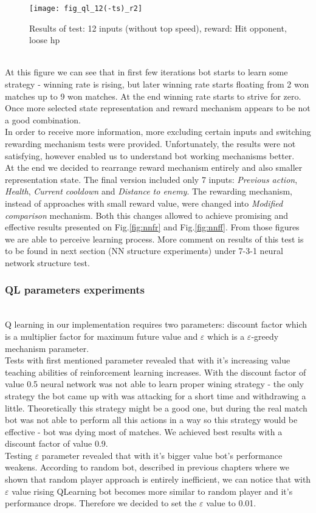 \begin{figure}[htp]
\centerline{\texttt{[image: fig\_ql\_12(-ts)\_r2]}}
\caption{Results of test: 12 inputs (without top speed), reward: Hit opponent, loose hp}
\label{fig:third}
\end{figure}
\\ \hphantom{x}
At this figure we can see that in first few iterations bot starts to learn some strategy - winning rate is rising, but later winning rate starts floating from 2 won matches up to 9 won matches. At the end winning rate starts to strive for zero. Once more selected state representation and reward mechanism appears to be not a good combination.
\\ \hphantom{x}
In order to receive more information, more excluding certain inputs and switching rewarding mechanism tests were provided. Unfortunately, the results were not satisfying, however enabled us to understand bot working mechanisms better.
\\ \hphantom{x}
At the end we decided to rearrange reward mechanism entirely and also smaller representation state. The final version included only 7 inputs: \emph{Previous action},\emph{ Health}, \emph{Current cooldown} and\emph{ Distance to enemy}. The rewarding mechanism, instead of approaches with small reward value, were changed into \emph{Modified comparison} mechanism. Both this changes allowed to achieve promising and effective results presented on Fig.\ref{fig:nnfr} and Fig.\ref{fig:nnff}. From those figures we are able to perceive learning process. More comment on results of this test is to be found in next section (NN structure experiments) under 7-3-1 neural network structure test.
\\
\subsubsection{QL parameters experiments}\hfill \\ \hphantom{x}
Q learning in our implementation requires two parameters: discount factor which is a multiplier factor for maximum future value and $\varepsilon$ which is a $\varepsilon$-greedy mechanism parameter. \\ \hphantom{x}
Tests with first mentioned parameter revealed that with it's increasing value teaching abilities of reinforcement learning increases. With the discount factor of value 0.5 neural network was not able to learn proper wining strategy - the only strategy the bot came up with was attacking for a short time and withdrawing a little. Theoretically this strategy might be a good one, but during the real match bot was not able to perform all this actions in a way so this strategy would be effective - bot was dying most of matches. We achieved best results with a discount factor of value 0.9. \\ \hphantom{x}
Testing $\varepsilon$ parameter revealed that with it's bigger value bot's performance weakens. According to random bot, described in previous chapters where we shown that random player approach is entirely inefficient, we can notice that with $\varepsilon$ value rising QLearning bot becomes more similar to random player and it's performance drops. Therefore we decided to set the $\varepsilon$ value to 0.01.
\\
